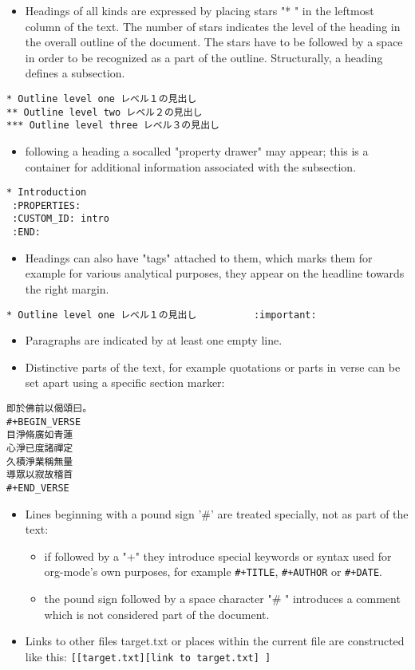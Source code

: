 \documentclass[11pt]{article}
\begin{document}
\begin{itemize}
\item Headings of all kinds are expressed by placing stars "* " in the
leftmost column of the text. The number of stars indicates the
level of the heading in the overall outline of the document. The
stars have to be followed by a space in order to be recognized as
a part of the outline. Structurally, a heading defines a
subsection.
\end{itemize}
\begin{verbatim}
* Outline level one レベル１の見出し
** Outline level two レベル２の見出し
*** Outline level three レベル３の見出し
\end{verbatim}
\begin{itemize}
\item following a heading a socalled "property drawer" may appear; this
is a container for additional information associated with the
subsection.
\end{itemize}
\begin{verbatim}
* Introduction
 :PROPERTIES:
 :CUSTOM_ID: intro
 :END:
\end{verbatim}
\begin{itemize}
\item Headings can also have "tags" attached to them, which marks them
for example for various analytical purposes, they appear on the
headline towards the right margin.
\end{itemize}
\begin{verbatim}
* Outline level one レベル１の見出し          :important:
\end{verbatim}
\begin{itemize}
\item Paragraphs are indicated by at least one empty line.
\item Distinctive parts of the text, for example quotations or parts in
verse can be set apart using a specific section marker:
\end{itemize}
\begin{verbatim}
即於佛前以偈頌曰。
#+BEGIN_VERSE
目淨脩廣如青蓮
心淨已度諸禪定
久積淨業稱無量
導眾以寂故稽首
#+END_VERSE
\end{verbatim}
\begin{itemize}
\item Lines beginning with a pound sign '\#' are treated specially, not as part of the text:
\begin{itemize}
\item if followed by a "+" they introduce special keywords or syntax
used for org-mode's own purposes, for example \texttt{\#+TITLE},
\texttt{\#+AUTHOR} or \texttt{\#+DATE}.
\item the pound sign followed by a space character "\# " introduces a
comment which is not considered part of the document.
\end{itemize}
\item Links to other files target.txt or places within the current file
are constructed like this: \texttt{[[target.txt][link to target.txt] ]}
\end{itemize}
\end{document}
